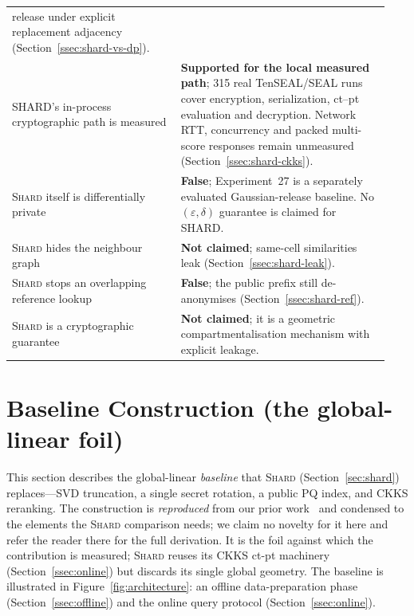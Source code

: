 \documentclass[11pt,a4paper]{article}
\begin{document}
\begin{table}[tbp]
\begin{tabular}{@{}p{0.42\linewidth}p{0.52\linewidth}@{}}
release under explicit replacement adjacency
(Section~\ref{ssec:shard-vs-dp}). \\
SHARD's in-process cryptographic path is measured &
\textbf{Supported for the local measured path}; 315 real TenSEAL/SEAL runs
cover encryption, serialization, ct--pt evaluation and decryption. Network
RTT, concurrency and packed multi-score responses remain unmeasured
(Section~\ref{ssec:shard-ckks}). \\
\textsc{Shard} itself is differentially private &
\textbf{False}; Experiment~27 is a separately evaluated Gaussian-release
baseline. No $(\varepsilon,\delta)$ guarantee is claimed for SHARD. \\
\textsc{Shard} hides the neighbour graph &
\textbf{Not claimed}; same-cell similarities leak
(Section~\ref{ssec:shard-leak}). \\
\textsc{Shard} stops an overlapping reference lookup &
\textbf{False}; the public prefix still de-anonymises
(Section~\ref{ssec:shard-ref}). \\
\textsc{Shard} is a cryptographic guarantee &
\textbf{Not claimed}; it is a geometric compartmentalisation mechanism with
explicit leakage. \\
\bottomrule
\end{tabular}
\end{table}

\section{Baseline Construction (the global-linear foil)}\label{sec:method}

This section describes the global-linear \emph{baseline} that
\textsc{Shard} (Section~\ref{sec:shard}) replaces---SVD truncation, a single
secret rotation, a public PQ index, and CKKS reranking. The construction is
\emph{reproduced} from our prior work~\cite{ref_vkit,ref_alpha} and condensed
to the elements the \textsc{Shard} comparison needs; we claim no novelty for
it here and refer the reader there for the full derivation. It is the foil
against which the contribution is measured; \textsc{Shard} reuses its CKKS
ct-pt machinery (Section~\ref{ssec:online}) but
discards its single global geometry. The baseline is illustrated in
Figure~\ref{fig:architecture}: an offline data-preparation phase
(Section~\ref{ssec:offline}) and the online query protocol
(Section~\ref{ssec:online}).
\end{document}
